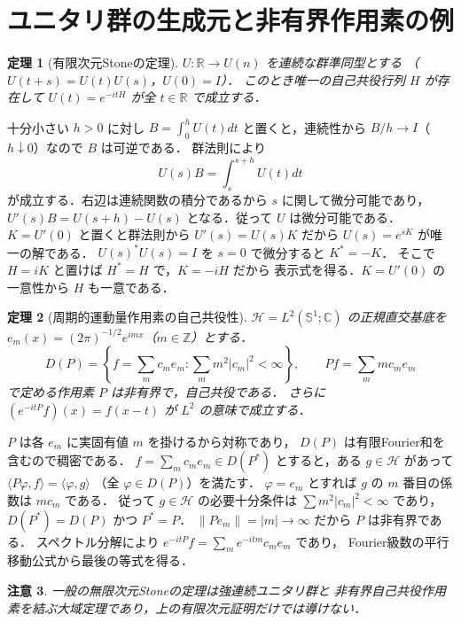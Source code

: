\documentclass[a5paper,10pt,onecolumn]{jsarticle}
\makeatletter
\theoremstyle{mathnotetheorem}
\newtheorem{theorem}{定理}[section]
\newtheorem{remark}[theorem]{注意}
\renewcommand{\proofname}{証明}
\renewenvironment{proof}[1][\proofname]{%
  \par\pushQED{\qed}\normalfont\topsep4\p@\@plus2\p@\relax
  \trivlist\item[\hskip\labelsep\bfseries #1]\ignorespaces
}{\popQED\endtrivlist\@endpefalse}
\newcommand{\norm}[1]{\lVert #1\rVert}
\makeatother
\begin{document}
\section{ユニタリ群の生成元と非有界作用素の例}
\begin{theorem}[有限次元Stoneの定理]
$U:\mathbb R\to U(n)$ を連続な群準同型とする
（$U(t+s)=U(t)U(s)$，$U(0)=I$）．
このとき唯一の自己共役行列 $H$ が存在して
$U(t)=e^{-itH}$ が全 $t\in\mathbb R$ で成立する．
\end{theorem}
\begin{proof}
十分小さい $h>0$ に対し
$B=\int_0^hU(t)dt$ と置くと，連続性から
$B/h\to I$（$h\downarrow0$）なので $B$ は可逆である．
群法則により
\[
 U(s)B=\int_s^{s+h}U(t)dt
\]
が成立する．右辺は連続関数の積分であるから $s$ に関して微分可能であり，
$U'(s)B=U(s+h)-U(s)$ となる．従って $U$ は微分可能である．
$K=U'(0)$ と置くと群法則から $U'(s)=U(s)K$ だから
$U(s)=e^{sK}$ が唯一の解である．
$U(s)^*U(s)=I$ を $s=0$ で微分すると $K^*=-K$．
そこで $H=iK$ と置けば $H^*=H$ で，$K=-iH$ だから
表示式を得る．$K=U'(0)$ の一意性から $H$ も一意である．
\end{proof}
\begin{theorem}[周期的運動量作用素の自己共役性]
$\mathcal H=L^2(\mathbb S^1;\mathbb C)$ の正規直交基底を
$e_m(x)=(2\pi)^{-1/2}e^{imx}$（$m\in\mathbb Z$）とする．
\[
 D(P)=\left\{f=\sum_m c_me_m:\sum_m m^2|c_m|^2<\infty\right\},
 \qquad Pf=\sum_m m c_me_m
\]
で定める作用素 $P$ は非有界で，自己共役である．
さらに $(e^{-itP}f)(x)=f(x-t)$ が $L^2$ の意味で成立する．
\end{theorem}
\begin{proof}
$P$ は各 $e_m$ に実固有値 $m$ を掛けるから対称であり，
$D(P)$ は有限Fourier和を含むので稠密である．
$f=\sum_m c_me_m\in D(P^*)$ とすると，ある $g\in\mathcal H$ があって
$\langle P\varphi,f\rangle=\langle\varphi,g\rangle$
（全 $\varphi\in D(P)$）を満たす．
$\varphi=e_m$ とすれば $g$ の $m$ 番目の係数は $m c_m$ である．
従って $g\in\mathcal H$ の必要十分条件は
$\sum m^2|c_m|^2<\infty$ であり，
$D(P^*)=D(P)$ かつ $P^*=P$．
$\norm{Pe_m}=|m|\to\infty$ だから $P$ は非有界である．
スペクトル分解により
$e^{-itP}f=\sum_m e^{-itm}c_me_m$ であり，
Fourier級数の平行移動公式から最後の等式を得る．
\end{proof}
\begin{remark}
一般の無限次元Stoneの定理は強連続ユニタリ群と
非有界自己共役作用素を結ぶ大域定理であり，上の有限次元証明だけでは導けない．
\end{remark}
\end{document}
